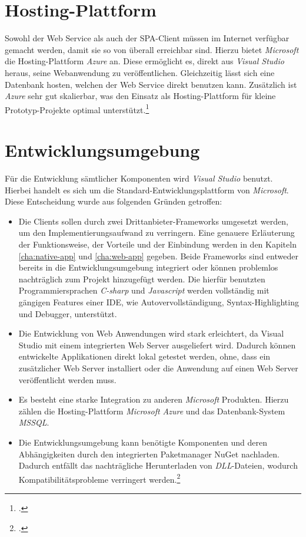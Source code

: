 \section{Hosting-Plattform}
\label{sec:Hosting-Plattform}
Sowohl der Web Service als auch der \ac{SPA}-Client müssen im Internet verfügbar gemacht werden, damit sie so von überall erreichbar sind. Hierzu bietet \textit{Microsoft} die Hosting-Plattform \textit{Azure} an. Diese ermöglicht es, direkt aus \textit{\ac{Visual Studio}} heraus, seine Webanwendung zu veröffentlichen. Gleichzeitig lässt sich eine Datenbank hosten, welchen der Web Service direkt benutzen kann. Zusätzlich ist \textit{Azure} sehr gut skalierbar, was den Einsatz als Hosting-Plattform für kleine Prototyp-Projekte optimal unterstützt.\footcite{online:Azure}
\section{Entwicklungsumgebung}
\label{sec:entwicklungsumgebung}
Für die Entwicklung sämtlicher Komponenten wird \textit{\ac{Visual Studio}} benutzt. Hierbei handelt es sich um die Standard-Entwicklungsplattform von \textit{Microsoft}. Diese Entscheidung wurde aus folgenden Gründen getroffen:
\begin{itemize}
\item Die Clients sollen durch zwei Drittanbieter-Frameworks umgesetzt werden, um den Implementierungsaufwand zu verringern. Eine genauere Erläuterung der Funktionsweise, der Vorteile und der Einbindung werden in den Kapiteln \ref{cha:native-app} und \ref{cha:web-app} gegeben. Beide Frameworks sind entweder bereits in die Entwicklungsumgebung integriert oder können problemlos nachträglich zum Projekt hinzugefügt werden. Die hierfür benutzten Programmiersprachen \textit{\gls{C-sharp}} und \textit{\gls{Javascript}} werden vollständig mit gängigen Features einer \ac{IDE}, wie Autovervollständigung, Syntax-Highlighting und Debugger, unterstützt. 
\item Die Entwicklung von Web Anwendungen wird stark erleichtert, da \ac{Visual Studio} mit einem integrierten Web Server ausgeliefert wird. Dadurch können entwickelte Applikationen direkt lokal getestet werden, ohne, dass ein zusätzlicher Web Server installiert oder die Anwendung auf einen Web Server veröffentlicht werden muss.
\item Es besteht eine starke Integration zu anderen \textit{Microsoft} Produkten. Hierzu zählen die Hosting-Plattform \textit{Microsoft Azure} und das Datenbank-System \textit{\ac{MSSQL}}.
\item Die Entwicklungsumgebung kann benötigte Komponenten und deren Abhängigkeiten durch den integrierten Paketmanager \gls{NuGet} nachladen. Dadurch entfällt das nachträgliche Herunterladen von \textit{\ac{DLL}}-Dateien, wodurch Kompatibilitätsprobleme verringert werden.\footcite{online:VisualStudio}
\end{itemize}

